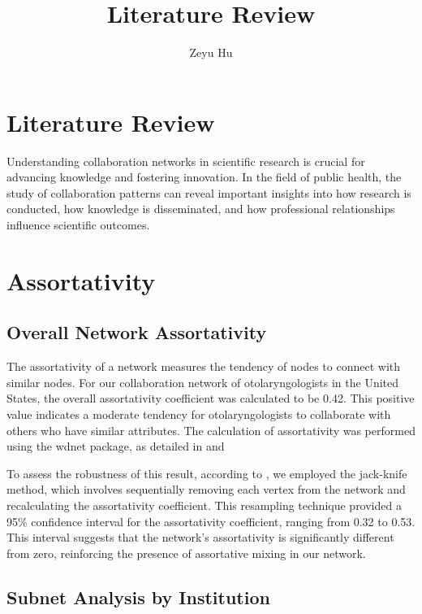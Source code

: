 \documentclass[12pt]{article}
\title{Literature Review}
\author{Zeyu Hu\\
}
\begin{document}
\maketitle

\begin{abstract}

\end{abstract}

\doublespacing

\section{Literature Review}
Understanding collaboration networks in scientific research is crucial for advancing knowledge and fostering innovation. In the field of public health, the study of collaboration patterns can reveal important insights into how research is conducted, how knowledge is disseminated, and how professional relationships influence scientific outcomes. 
\section{Assortativity}
\subsection{Overall Network Assortativity}

The assortativity of a network measures the tendency of nodes to connect with similar nodes. For our collaboration network of otolaryngologists in the United States, the overall assortativity coefficient was calculated to be 0.42. This positive value indicates a moderate tendency for otolaryngologists to collaborate with others who have similar attributes. The calculation of assortativity was performed using the wdnet package, as detailed in \citep{yuan2021assortativity} and \citep{yuan2023generating}


To assess the robustness of this result, according to \citep{pigorsch2022assortative}, we employed the jack-knife method, which involves sequentially removing each vertex from the network and recalculating the assortativity coefficient. This resampling technique provided a 95\% confidence interval for the assortativity coefficient, ranging from 0.32 to 0.53. This interval suggests that the network's assortativity is significantly different from zero, reinforcing the presence of assortative mixing in our network. 
\subsection{Subnet Analysis by Institution}
\end{document}
